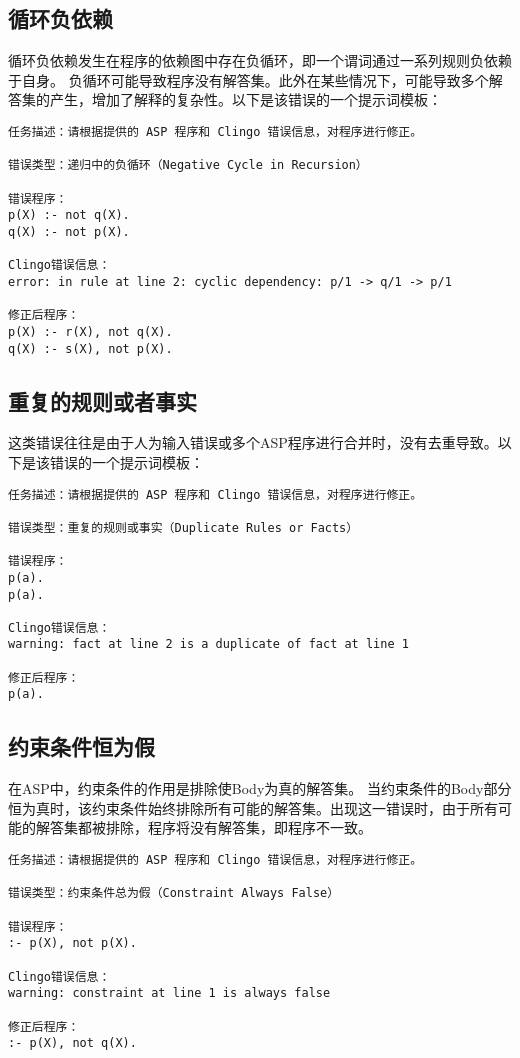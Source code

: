 \subsection{循环负依赖}
循环负依赖发生在程序的依赖图中存在负循环，即一个谓词通过一系列规则负依赖于自身。
负循环可能导致程序没有解答集。​此外在某些情况下，可能导致多个解答集的产生，增加了解释的复杂性。以下是该错误的一个提示词模板：
\begin{lstlisting}
任务描述：请根据提供的 ASP 程序和 Clingo 错误信息，对程序进行修正。

错误类型：​递归中的负循环（Negative Cycle in Recursion）​

错误程序：
p(X) :- not q(X).
q(X) :- not p(X).

Clingo错误信息：
error: in rule at line 2: cyclic dependency: p/1 -> q/1 -> p/1

修正后程序：
p(X) :- r(X), not q(X).
q(X) :- s(X), not p(X).
\end{lstlisting}
\subsection{重复的规则或者事实}
这类错误往往是由于人为输入错误或多个ASP程序进行合并时，没有去重导致。以下是该错误的一个提示词模板：
\begin{lstlisting}
任务描述：请根据提供的 ASP 程序和 Clingo 错误信息，对程序进行修正。

错误类型：​重复的规则或事实（Duplicate Rules or Facts）​

错误程序：
p(a).
p(a).

Clingo错误信息：
warning: fact at line 2 is a duplicate of fact at line 1

修正后程序：
p(a).
\end{lstlisting}
\subsection{约束条件恒为假}
在ASP中，约束条件的作用是排除使Body为真的解答集。
当约束条件的Body部分恒为真时，该约束条件始终排除所有可能的解答集。出现这一错误时，由于所有可能的解答集都被排除，程序将没有解答集，即程序不一致。
\begin{lstlisting}
任务描述：请根据提供的 ASP 程序和 Clingo 错误信息，对程序进行修正。

错误类型：​约束条件总为假（Constraint Always False）

错误程序：
:- p(X), not p(X).

Clingo错误信息：
warning: constraint at line 1 is always false

修正后程序：
:- p(X), not q(X).
\end{lstlisting}
